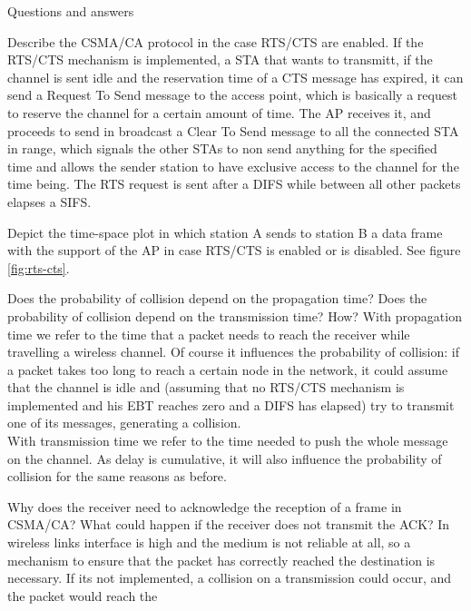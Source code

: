 \begin{section}{Questions and answers}
  \begin{subsubsection}{Describe the CSMA/CA protocol in the case RTS/CTS are enabled.}
    If the RTS/CTS mechanism is implemented, a STA that wants to transmitt, if the channel is sent
    idle and the reservation time of a CTS message has expired, it can send a Request To Send
    message to the access point, which is basically a request to reserve the channel for a certain
    amount of time. The AP receives it, and proceeds to send in broadcast a Clear To Send message to
    all the connected STA in range, which signals the other STAs to non send anything for the
    specified time and allows the sender station to have exclusive access to the channel for the
    time being. The RTS request is sent after a DIFS while between all other packets elapses a SIFS.
  \end{subsubsection}
  \begin{subsubsection}{Depict the time-space plot in which station A sends to station B a data
    frame with the support of the AP in case RTS/CTS is enabled or is disabled.}
    See figure \ref{fig:rts-cts}.
  \end{subsubsection}
  \begin{subsubsection}{Does the probability of collision depend on the propagation time? Does the
    probability of collision depend on the transmission time? How?}
    With propagation time we refer to the time that a packet needs to reach the receiver while
    travelling a wireless channel. Of course it influences the probability of collision: if a packet
    takes too long to reach a certain node in the network, it could assume that the channel is idle
    and (assuming that no RTS/CTS mechanism is implemented and his EBT reaches zero and a DIFS has
    elapsed) try to transmit one of its messages, generating a collision.\\
    With transmission time we refer to the time needed to push the whole message on the channel. As
    delay is cumulative, it will also influence the probability of collision for the same reasons as
    before.
  \end{subsubsection}
  \begin{subsubsection}{Why does the receiver need to acknowledge the reception of a frame in
    CSMA/CA? What could happen if the receiver does not transmit the ACK?}
    In wireless links interface is high and the medium is not reliable at all, so a mechanism to
    ensure that the packet has correctly reached the destination is necessary. If its not
    implemented, a collision on a transmission could occur, and the packet would reach the

\end{subsubsection}
\end{section}
